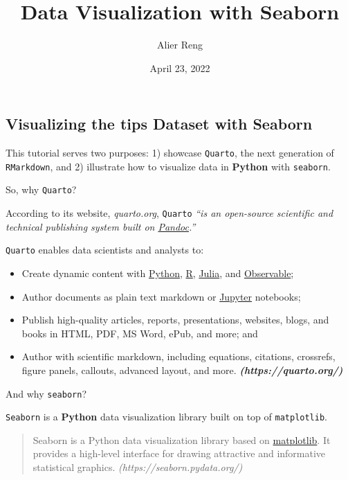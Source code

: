 \documentclass[
  letterpaper,
  DIV=11,
  numbers=noendperiod]{scrartcl}
\title{Data Visualization with Seaborn}
\author{Alier Reng}
\date{April 23, 2022}
\begin{document}
\maketitle

\hypertarget{visualizing-the-tips-dataset-with-seaborn}{%
\subsection{Visualizing the tips Dataset with
Seaborn}\label{visualizing-the-tips-dataset-with-seaborn}}

This tutorial serves two purposes: 1) showcase \texttt{Quarto}, the next
generation of \texttt{RMarkdown}, and 2) illustrate how to visualize
data in \textbf{Python} with \texttt{seaborn}.

So, why \texttt{Quarto}?

According to its website, \emph{quarto.org}, \texttt{Quarto} \emph{``is
an open-source scientific and technical publishing system built on
\href{https://pandoc.org/}{Pandoc}.''}

\texttt{Quarto} enables data scientists and analysts to:

\begin{itemize}
\item
  Create dynamic content with
  \href{https://quarto.org/docs/computations/python.html}{Python},
  \href{https://quarto.org/docs/computations/r.html}{R},
  \href{https://quarto.org/docs/computations/julia.html}{Julia}, and
  \href{https://quarto.org/docs/computations/ojs.html}{Observable};
\item
  Author documents as plain text markdown or
  \href{https://jupyter.org/}{Jupyter} notebooks;
\item
  Publish high-quality articles, reports, presentations, websites,
  blogs, and books in HTML, PDF, MS Word, ePub, and more; and
\item
  Author with scientific markdown, including equations, citations,
  crossrefs, figure panels, callouts, advanced layout, and more.
  \textbf{\emph{(https://quarto.org/)}}
\end{itemize}

And why \texttt{seaborn}?

\texttt{Seaborn} is a \textbf{Python} data visualization library built
on top of \texttt{matplotlib}.

\begin{quote}
Seaborn is a Python data visualization library based on
\href{https://matplotlib.org/}{matplotlib}. It provides a high-level
interface for drawing attractive and informative statistical graphics.
\emph{(https://seaborn.pydata.org/)}
\end{quote}
\end{document}
